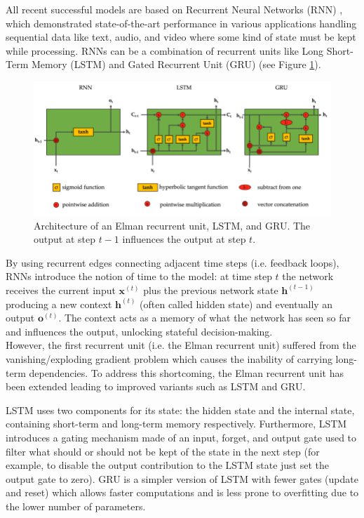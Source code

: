 \documentclass[a4paper, 12pt]{article} %
\begin{document}
	All recent successful models are based on Recurrent Neural Networks (RNN) \cite{RNN, RNNForecasting}, which demonstrated state-of-the-art performance in various applications handling sequential data like text, audio, and video where some kind of state must be kept while processing. RNNs can be a combination of recurrent units like Long Short-Term Memory (LSTM) and Gated Recurrent Unit (GRU) (see Figure \ref{fig:lstmgru}). 
	\begin{figure}
		\includegraphics[width=\linewidth]{img/rnns.png}
		\caption{Architecture of an Elman recurrent unit, LSTM, and GRU. The output at step $t-1$ influences the output at step $t$.}
		\label{fig:lstmgru}
	\end{figure}
	By using recurrent edges connecting adjacent time steps (i.e. feedback loops), RNNs introduce the notion of time to the model: at time step $t$ the network receives the current input $\pmb{x}^{(t)}$ plus the previous network state $\pmb{h}^{(t-1)}$ producing a new context $\pmb{h}^{(t)}$ (often called hidden state) and eventually an output $\pmb{o}^{(t)}$.
	The context acts as a memory of what the network has seen so far and influences the output, unlocking stateful decision-making.\\
	However, the first recurrent unit (i.e. the Elman recurrent unit) suffered from the vanishing/exploding gradient problem \cite{VanishingGradient} which causes the inability of carrying long-term dependencies. To address this shortcoming, the Elman recurrent unit has been extended leading to improved variants such as LSTM and GRU.
	
	LSTM uses two components for its state: the hidden state and the internal state, containing short-term and long-term memory respectively. Furthermore, LSTM introduces a gating mechanism made of an input, forget, and output gate used to filter what should or should not be kept of the state in the next step (for example, to disable the output contribution to the LSTM state just set the output gate to zero). GRU is a simpler version of LSTM with fewer gates (update and reset) which allows faster computations and is less prone to overfitting due to the lower number of parameters.
	
\end{document}
